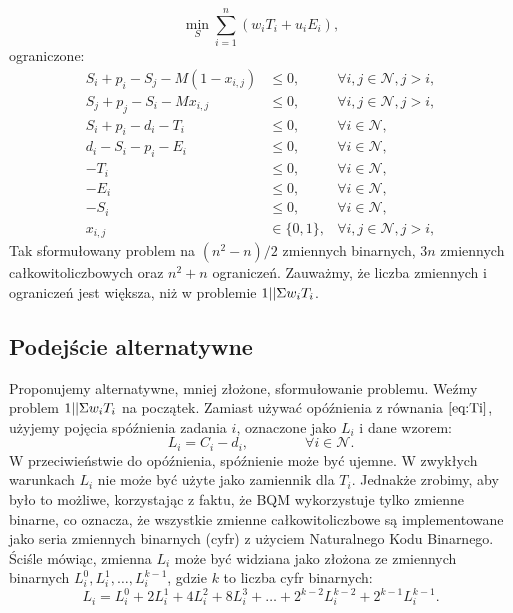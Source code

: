 \begin{equation}\label{eq:uiEi_dwave_A_1}
    \min_S \sum_{i=1}^n (w_i T_i + u_i E_i) ,
\end{equation}
%
ograniczone:
%
\begin{align}
    S_i + p_i - S_j - M(1-x_{i,j}) & \leq{} 0, & \forall{}i,j\in{}\mathcal{N},j>i, \label{eq:uiEi_dwave_A_2} \\
    S_j + p_j - S_i - Mx_{i,j} & \leq{} 0, & \forall{}i,j\in{}\mathcal{N},j>i, \label{eq:uiEi_dwave_A_3} \\
    S_i+p_i-d_i-T_i & \leq{} 0, & \forall{}i\in{}\mathcal{N}, \label{eq:uiEi_dwave_A_4} \\
    d_i-S_i-p_i-E_i & \leq{} 0, & \forall{}i\in{}\mathcal{N}, \label{eq:uiEi_dwave_A_5} \\
    -T_i & \leq{} 0, & \forall{}i\in{}\mathcal{N}, \label{eq:uiEi_dwave_A_6} \\
    -E_i & \leq{} 0, & \forall{}i\in{}\mathcal{N}, \label{eq:uiEi_dwave_A_7} \\
    -S_i & \leq{} 0, & \forall{}i\in{}\mathcal{N}, \label{eq:uiEi_dwave_A_8} \\
    x_{i,j} & \in \{0,1\}, & \forall{}i,j\in{}\mathcal{N},j>i, \label{eq:uiEi_dwave_A_9}
\end{align}
%
Tak sformułowany problem na $(n^2-n)/2$ zmiennych binarnych, $3n$ zmiennych całkowitoliczbowych oraz $n^2+n$ ograniczeń. Zauważmy, że liczba zmiennych i ograniczeń jest większa, niż w problemie $1||\Sigma{}w_i T_i$.

\subsection{Podejście alternatywne}

Proponujemy alternatywne, mniej złożone, sformułowanie problemu. Weźmy problem $1||\Sigma{}w_i T_i$ na początek.
Zamiast używać opóźnienia z równania $\eqref{eq:Ti}$, użyjemy pojęcia spóźnienia zadania $i$, oznaczone jako $L_i$ i dane wzorem:
%
\begin{equation}\label{eq:Li}
    L_i = C_i - d_i, \quad{}\quad{}\quad{}\quad{} \forall{}i\in\mathcal{N} .
\end{equation}
%
W przeciwieństwie do opóźnienia, spóźnienie może być ujemne. W zwykłych warunkach $L_i$ nie może być użyte jako zamiennik dla $T_i$. Jednakże zrobimy, aby było to możliwe, korzystając z faktu, że BQM wykorzystuje tylko zmienne binarne, co oznacza, że wszystkie zmienne całkowitoliczbowe są implementowane jako seria zmiennych binarnych (cyfr) z użyciem Naturalnego Kodu Binarnego. Ściśle mówiąc, zmienna $L_i$ może być widziana jako złożona ze zmiennych binarnych $L_i^0, L_i^1,\dots{}, L_i^{k-1}$, gdzie $k$ to liczba cyfr binarnych:
%
\begin{equation}\label{eq:Li_nbc}
    L_i = L_i^0 + 2 L_i^1 + 4 L_i^2 + 8 L_i^3 + \dots{} + 2^{k-2} L_i^{k-2} + 2^{k-1} L_i^{k-1} . 
\end{equation}


